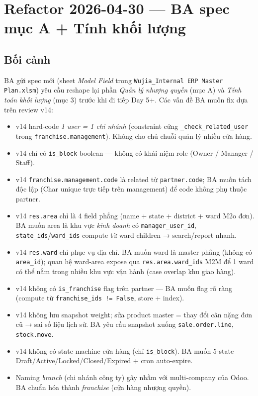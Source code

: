 \chapter{Refactor 2026-04-30 --- BA spec mục A + Tính khối lượng}

\section{Bối cảnh}

BA gửi spec mới (sheet \emph{Model Field} trong \texttt{Wujia\_Internal ERP Master Plan.xlsm}) yêu cầu reshape lại phần \emph{Quản lý nhượng quyền} (mục A) và \emph{Tính toán khối lượng} (mục 3) trước khi đi tiếp Day 5+. Các vấn đề BA muốn fix dựa trên review v14:

\begin{itemize}
    \item v14 hard-code \emph{1 user = 1 chi nhánh} (constraint cứng \texttt{\_check\_related\_user} trong \texttt{franchise.management}). Không cho chủ chuỗi quản lý nhiều cửa hàng.
    \item v14 chỉ có \texttt{is\_block} boolean --- không có khái niệm role (Owner / Manager / Staff).
    \item v14 \texttt{franchise.management.code} là related từ \texttt{partner.code}; BA muốn tách độc lập (Char unique trực tiếp trên management) để code không phụ thuộc partner.
    \item v14 \texttt{res.area} chỉ là 4 field phẳng (name + state + district + ward M2o đơn). BA muốn area là khu vực \emph{kinh doanh} có \texttt{manager\_user\_id}, \texttt{state\_ids}/\texttt{ward\_ids} compute từ ward children → search/report nhanh.
    \item v14 \texttt{res.ward} chỉ phục vụ địa chỉ. BA muốn ward là master phẳng (không có \texttt{area\_id}); quan hệ ward-area expose qua \texttt{res.area.ward\_ids} M2M để 1 ward có thể nằm trong nhiều khu vực vận hành (case overlap khu giao hàng).
    \item v14 không có \texttt{is\_franchise} flag trên partner --- BA muốn flag rõ ràng (compute từ \texttt{franchise\_ids != False}, store + index).
    \item v14 không lưu snapshot weight; sửa product master = thay đổi cân nặng đơn cũ → sai số liệu lịch sử. BA yêu cầu snapshot xuống \texttt{sale.order.line}, \texttt{stock.move}.
    \item v14 không có state machine cửa hàng (chỉ \texttt{is\_block}). BA muốn 5-state Draft/Active/Locked/Closed/Expired + cron auto-expire.
    \item Naming \emph{branch} (chi nhánh công ty) gây nhầm với multi-company của Odoo. BA chuẩn hóa thành \emph{franchise} (cửa hàng nhượng quyền).
\end{itemize}

